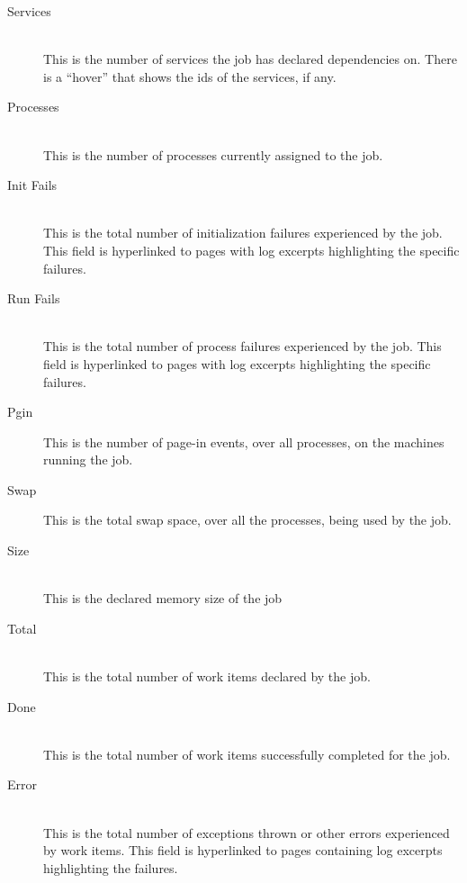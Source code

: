 \begin{description}
            \item[Services] \hfill \\
              This is the number of services the job has declared dependencies on.  There is a ``hover'' that
              shows the ids of the services, if any.

            \item[Processes] \hfill \\
              This is the number of processes currently assigned to the job.

            \item[Init Fails] \hfill \\
              This is the total number of initialization failures experienced by the job. This
              field is hyperlinked to pages with log excerpts highlighting the specific failures.
              
            \item[Run Fails] \hfill \\
              This is the total number of process failures experienced by the job. This field is
              hyperlinked to pages with log excerpts highlighting the specific failures.
              
            \item[Pgin] This is the number of page-in events, over all processes, on the machines
              running the job.

            \item[Swap] This is the total swap space, over all the processes, being used by the job.

            \item[Size] \hfill \\
              This is the declared memory size of the job
              
            \item[Total] \hfill \\
              This is the total number of work items declared by the job.
              
            \item[Done] \hfill \\
              This is the total number of work items successfully completed for the job.
              
            \item[Error] \hfill \\
              This is the total number of exceptions thrown or other errors experienced by work
              items. This field is hyperlinked to pages containing log excerpts highlighting
              the failures.
              

\end{description}
